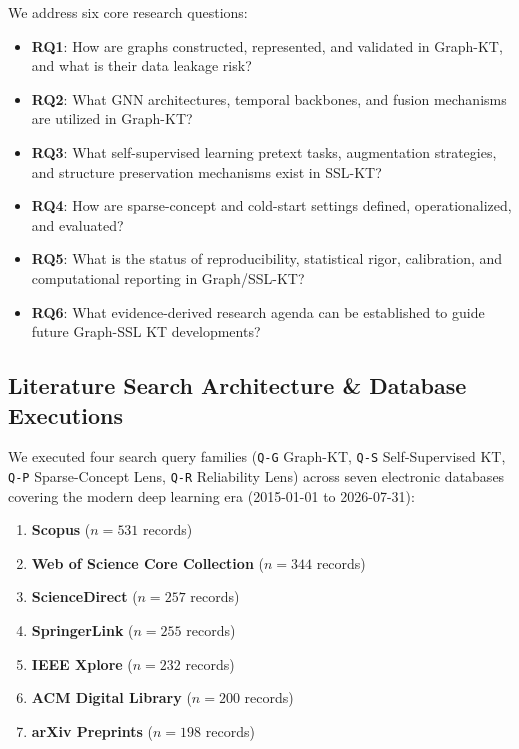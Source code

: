 \documentclass[journal]{IEEEtran}
\begin{document}
We address six core research questions:
\begin{itemize}
    \item \textbf{RQ1}: How are graphs constructed, represented, and validated in Graph-KT, and what is their data leakage risk?
    \item \textbf{RQ2}: What GNN architectures, temporal backbones, and fusion mechanisms are utilized in Graph-KT?
    \item \textbf{RQ3}: What self-supervised learning pretext tasks, augmentation strategies, and structure preservation mechanisms exist in SSL-KT?
    \item \textbf{RQ4}: How are sparse-concept and cold-start settings defined, operationalized, and evaluated?
    \item \textbf{RQ5}: What is the status of reproducibility, statistical rigor, calibration, and computational reporting in Graph/SSL-KT?
    \item \textbf{RQ6}: What evidence-derived research agenda can be established to guide future Graph-SSL KT developments?
\end{itemize}

\subsection{Literature Search Architecture \& Database Executions}
We executed four search query families (\texttt{Q-G} Graph-KT, \texttt{Q-S} Self-Supervised KT, \texttt{Q-P} Sparse-Concept Lens, \texttt{Q-R} Reliability Lens) across seven electronic databases covering the modern deep learning era (2015-01-01 to 2026-07-31):
\begin{enumerate}
    \item \textbf{Scopus} ($n = 531$ records)
    \item \textbf{Web of Science Core Collection} ($n = 344$ records)
    \item \textbf{ScienceDirect} ($n = 257$ records)
    \item \textbf{SpringerLink} ($n = 255$ records)
    \item \textbf{IEEE Xplore} ($n = 232$ records)
    \item \textbf{ACM Digital Library} ($n = 200$ records)
    \item \textbf{arXiv Preprints} ($n = 198$ records)
\end{enumerate}
\end{document}
